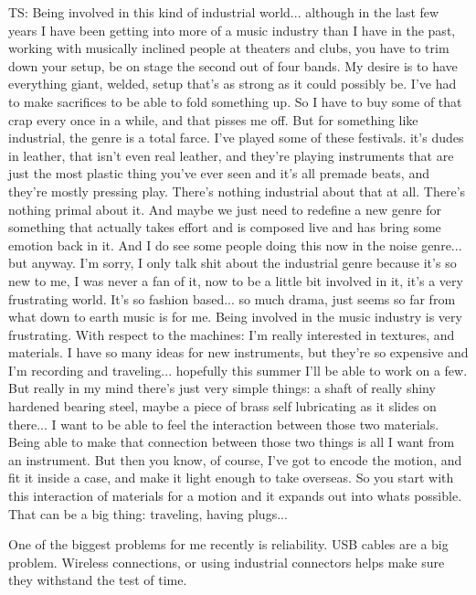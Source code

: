 TS: Being involved in this kind of industrial world... although in the last few years I have been getting into more of a music industry than I have in the past, working with musically inclined people at theaters and clubs, you have to trim down your setup, be on stage the second out of four bands. My desire is to have everything giant, welded, setup that's as strong as it could possibly be. I've had to make sacrifices to be able to fold something up. So I have to buy some of that crap every once in a while, and that pisses me off. But for something like industrial, the genre is a total farce. I've played some of these festivals. it's dudes in leather, that isn't even real leather, and they're playing instruments that are just the most plastic thing you've ever seen and it's all premade beats, and they're mostly pressing play. There's nothing industrial about that at all. There's nothing primal about it. And maybe we just need to redefine a new genre for something that actually takes effort and is composed live and has bring some emotion back in it. And I do see some people doing this now in the noise genre... but anyway. I'm sorry, I only talk shit about the industrial genre because it's so new to me, I was never a fan of it, now to be a little bit involved in it, it's  a very frustrating world. It's so fashion based... so much drama, just seems so far from what down to earth music is for me. Being involved in the music industry is very frustrating. With respect to the machines: I'm really interested in textures, and materials. I have so many ideas for new instruments, but they're so expensive and I'm recording and traveling... hopefully this summer I'll be able to work on a few. But really in my mind there's just very simple things: a shaft of really shiny hardened bearing steel, maybe a piece of brass self lubricating as it slides on there... I want to be able to feel the interaction between those two materials. Being able to make that connection between those two things is all I want from an instrument. But then you know, of course, I've got to encode the motion, and fit it inside a case, and make it light enough to take overseas. So you start with this interaction of materials for a motion and it expands out into whats possible. That can be a big thing: traveling, having plugs... 

One of the biggest problems for me recently is reliability. USB cables are a big problem. Wireless connections, or using industrial connectors helps make sure they withstand the test of time. 

